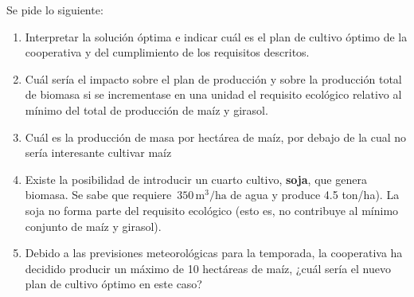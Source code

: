 \bigskip
Se pide lo siguiente:
\begin{enumerate}[label=\alph*)]
    \item Interpretar la solución óptima e indicar cuál es el plan de cultivo óptimo de la cooperativa y del cumplimiento de los requisitos descritos.

    \item Cuál sería el impacto sobre el plan de producción y sobre la producción total de biomasa si se incrementase en una unidad el requisito ecológico relativo al mínimo del total de producción de maíz y girasol.

    \item Cuál es la producción de masa por hectárea de maíz, por debajo de la cual no sería interesante cultivar maíz

    \item Existe la posibilidad de introducir un cuarto cultivo, \textbf{soja}, que genera biomasa.
    Se sabe que requiere \(\,350\,\text{m}^3/\text{ha}\) de agua y produce 4.5 ton/ha).
    La soja no forma parte del requisito ecológico (esto es, no contribuye al mínimo conjunto de maíz y girasol).
    
    \item Debido a las previsiones meteorológicas para la temporada, la cooperativa ha decidido producir un máximo de 10 hectáreas de maíz, ¿cuál sería el nuevo plan de cultivo óptimo en este caso? 
    
\end{enumerate}
